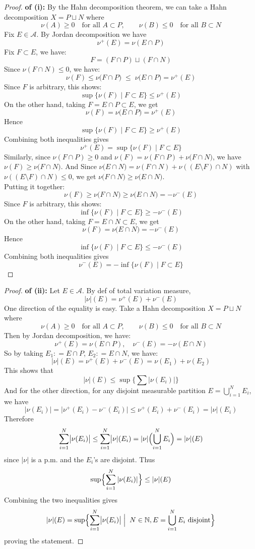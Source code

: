 \documentclass[lang=cn,11pt]{elegantbook}
\begin{document}
\begin{proof}
    \textbf{of (i):} By the Hahn decomposition theorem, we can take a Hahn decomposition \(X = P \sqcup N\) where \[
  \nu(A) \ge 0 \quad\text{for all }A\subset P,\qquad
  \nu(B) \le 0 \quad\text{for all }B\subset N
  \]
Fix $E\in\mathcal{A}$. By Jordan decomposition we have \[
  \nu^+(E) = \nu(E\cap P)
  \]Fix \(F\subset E\), we have:\[
  F = (F \cap P ) \sqcup (F \cap N)
  \]
  Since $\nu (F\cap N) \leq 0$, we have:  \[
  \nu(F) \le \nu\bigl(F\cap P\bigr) \;\le\; \nu\bigl(E\cap P\bigr) = 
  \nu^+(E)
  \]Since $F$ is arbitrary, this shows:  \[
  \sup\{\nu(F) \mid F \subset E\} \leq 
  \nu^+(E)
  \]
On the other hand, taking \(F = E\cap P\subset E\), we get \[
  \nu(F) =\nu\bigl(E\cap P\bigr) =  \nu^+(E)
  \]
  Hence \[
  \sup\{\nu(F) \mid F \subset E\} \geq 
  \nu^+(E)
  \]
  Combining both inequalities gives \[\nu^+(E) =  \sup\{\nu(F)\mid F\subset E\}\]
Similarly,  since $\nu (F\cap P) \geq 0$ and $\nu(F) = \nu (F\cap  P) + \nu\bigl(F\cap N\bigr)$, we have  $  \nu(F) \geq \nu\bigl(F\cap N\bigr) $. And Since $\nu \bigl (E\cap N\bigr)  =  \nu(F \cap N) +  \nu((E \setminus F) \cap N) $ with $ \nu((E \setminus F) \cap N)\leq 0$, we get $\nu\bigl(F\cap N\bigr) \ge \nu\bigl (E\cap N\bigr)$. \\
Putting it together:
\[
  \nu(F) \geq \nu\bigl(F\cap N\bigr) \ge \nu\bigl (E\cap N\bigr) = 
 -  \nu^-(E)
  \]Since $F$ is arbitrary, this shows:  \[
  \inf\{\nu(F) \mid F \subset E\} \geq  -  \nu^-(E)
  \]
On the other hand, taking \(F = E\cap N\subset E\), we get \[
  \nu(F) = \nu\bigl(E\cap N\bigr) = -   \nu^-(E)
  \]
  Hence \[
  \inf\{\nu(F) \mid F \subset E\} \leq  -  \nu^-(E)
  \]
  Combining both inequalities gives \[\nu^-(E) =  - \inf\{\nu(F)\mid F\subset E\}\]

\end{proof}
\begin{proof}
    \textbf{of (ii):}
Let $E\in \mathcal{A}$.
By def of total variation measure,  \[
  |\nu|(E) = 
  \nu^+(E)+\nu^-(E)
  \]
One direction of the equality is easy. Take a Hahn decomposition \(X = P \sqcup N\) where \[
  \nu(A) \ge 0 \quad\text{for all }A\subset P,\qquad
  \nu(B) \le 0 \quad\text{for all }B\subset N
  \]
Then by Jordan decomposition, we have:\[
  \nu^+(E) = \nu(E\cap P),\quad \nu^-(E) =  - \nu(E\cap N)
  \]
  So by taking $E_1 : = E \cap P$, $E_2 : = E \cap N$, we have: \[
    |\nu|(E) = 
  \nu^+(E)+\nu^-(E)  = \nu(E_1)  + \nu(E_2)
  \]This shows that \[
|\nu|(E) \leq 
\sup\bigl\{\sum|\nu(E_i)|\bigr\}
\]
  And for the other direction, for any disjoint measurable partition \(E = \bigcup_{i=1}^N E_i\), we have   \[
  |\nu(E_i)| = 
  \bigl|\nu^+(E_i) - \nu^-(E_i)\bigr| \leq 
  \nu^+(E_i) + \nu^-(E_i) = 
  |\nu|(E_i)
  \]
  Therefore \[  \sum_{i=1}^N \bigl|\nu(E_i)\bigr| \leq 
  \sum_{i=1}^N \bigl|\nu|(E_i) = 
  |\nu|\Bigl(\bigcup_{i=1}^N E_i\Bigr) = 
  |\nu|(E)
  \]
  since \(\lvert \nu\rvert\) is a p.m. and the \(E_i\)'s are disjoint. Thus \[
  \sup\Bigl\{\sum_{i=1}^N |\nu(E_i)|\Bigr\} \leq |\nu|(E)  \]
Combining the two inequalities gives
\[
|\nu|(E) = 
\sup\Bigl\{\sum_{i=1}^N \bigl|\nu(E_i)\bigr|\Bigm\vert\;N\in\mathbb{N},E=\bigcup_{i=1}^N E_i \text{ disjoint}\Bigr\}
\]
proving the statement.
\end{proof}
\end{document}
